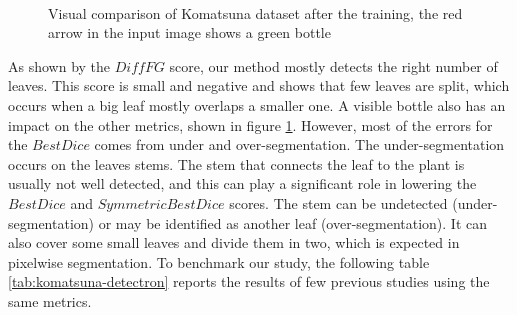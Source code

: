\documentclass[../thesis.tex]{subfiles}
\begin{document}
\begin{figure}[H]
         \\
        
        \caption{Visual comparison of Komatsuna dataset after the training, the red arrow in the input image shows a green bottle}
        \label{fig:07-eval-komatsuna}
    \end{figure}
    \vfill
    \null

    \newpage
    As shown by the $DiffFG$ score, our method mostly detects the right number of leaves. This score is small and negative and shows that few leaves are split, which occurs when a big leaf mostly overlaps a smaller one.
    A visible bottle also has an impact on the other metrics, shown in figure \ref{fig:07-eval-komatsuna}. However, most of the errors for the $BestDice$ comes from under and over-segmentation. The under-segmentation occurs on the leaves stems. The stem that connects the leaf to the plant is usually not well detected, and this can play a significant role in lowering the $BestDice$ and $SymmetricBestDice$ scores. The stem can be undetected (under-segmentation) or may be identified as another leaf (over-segmentation). It can also cover some small leaves and divide them in two, which is expected in pixelwise segmentation.  To benchmark our study, the following table \ref{tab:komatsuna-detectron} reports the results of few previous studies using the same metrics.
    
\end{document}
